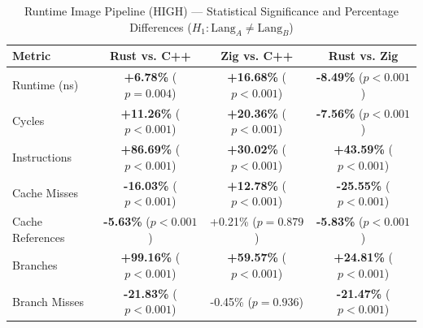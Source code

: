 \begin{table}[htbp]
\centering
\caption{Runtime Image Pipeline (HIGH) --- Statistical Significance and Percentage Differences ($H_1: \text{Lang}_A \neq \text{Lang}_B$)}
\label{tab:image_pipeline_runtime_HIGH_true_true_true}
\begin{tabular}{l ccc}
\toprule
\textbf{Metric} & \textbf{Rust vs. C++} & \textbf{Zig vs. C++} & \textbf{Rust vs. Zig} \\
\midrule
Runtime (ns) & \textbf{+6.78\%} ($p = 0.004$) & \textbf{+16.68\%} ($p < 0.001$) & \textbf{-8.49\%} ($p < 0.001$) \\
Cycles & \textbf{+11.26\%} ($p < 0.001$) & \textbf{+20.36\%} ($p < 0.001$) & \textbf{-7.56\%} ($p < 0.001$) \\
Instructions & \textbf{+86.69\%} ($p < 0.001$) & \textbf{+30.02\%} ($p < 0.001$) & \textbf{+43.59\%} ($p < 0.001$) \\
Cache Misses & \textbf{-16.03\%} ($p < 0.001$) & \textbf{+12.78\%} ($p < 0.001$) & \textbf{-25.55\%} ($p < 0.001$) \\
Cache References & \textbf{-5.63\%} ($p < 0.001$) & +0.21\% ($p = 0.879$) & \textbf{-5.83\%} ($p < 0.001$) \\
Branches & \textbf{+99.16\%} ($p < 0.001$) & \textbf{+59.57\%} ($p < 0.001$) & \textbf{+24.81\%} ($p < 0.001$) \\
Branch Misses & \textbf{-21.83\%} ($p < 0.001$) & -0.45\% ($p = 0.936$) & \textbf{-21.47\%} ($p < 0.001$) \\
\bottomrule
\end{tabular}
\end{table}



